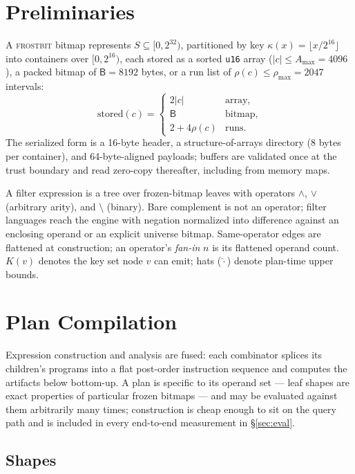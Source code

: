 \documentclass[sigconf,nonacm]{acmart}
\newcommand{\fb}{\textsc{frostbit}}
\newcommand{\B}{\ensuremath{\mathsf{B}}}
\newcommand{\stored}{\ensuremath{\mathrm{stored}}}
\begin{document}
\section{Preliminaries}
\label{sec:prelim}

A \fb{} bitmap represents $S \subseteq [0, 2^{32})$, partitioned by key
$\kappa(x) = \lfloor x/2^{16} \rfloor$ into containers over
$[0, 2^{16})$, each stored as a sorted \texttt{u16} array
($|c| \le A_{\max} = 4096$), a packed bitmap of $\B = 8192$ bytes, or a
run list of $\rho(c) \le \rho_{\max} = 2047$ intervals:
\[
\stored(c) =
\begin{cases}
2|c| & \text{array},\\
\B & \text{bitmap},\\
2+4\rho(c) & \text{runs.}
\end{cases}
\]
The serialized form is a 16-byte header, a structure-of-arrays directory
(8 bytes per container), and 64-byte-aligned payloads; buffers are
validated once at the trust boundary and read zero-copy thereafter,
including from memory maps.

A filter expression is a tree over frozen-bitmap leaves with operators
$\wedge$, $\vee$ (arbitrary arity), and $\setminus$ (binary). Bare
complement is not an operator; filter languages reach the engine with
negation normalized into difference against an enclosing operand or an
explicit universe bitmap. Same-operator edges are flattened at
construction; an operator's \emph{fan-in} $n$ is its flattened operand
count. $K(v)$ denotes the key set node $v$ can emit; hats
($\widehat{\cdot}$) denote plan-time upper bounds.

\section{Plan Compilation}
\label{sec:analysis}

Expression construction and analysis are fused: each combinator splices
its children's programs into a flat post-order instruction sequence and
computes the artifacts below bottom-up. A plan is specific to its
operand set --- leaf shapes are exact properties of particular frozen
bitmaps --- and may be evaluated against them arbitrarily many times;
construction is cheap enough to sit on the query path and is included
in every end-to-end measurement in \S\ref{sec:eval}.

\subsection{Shapes}
\label{sec:shapes}
\end{document}
